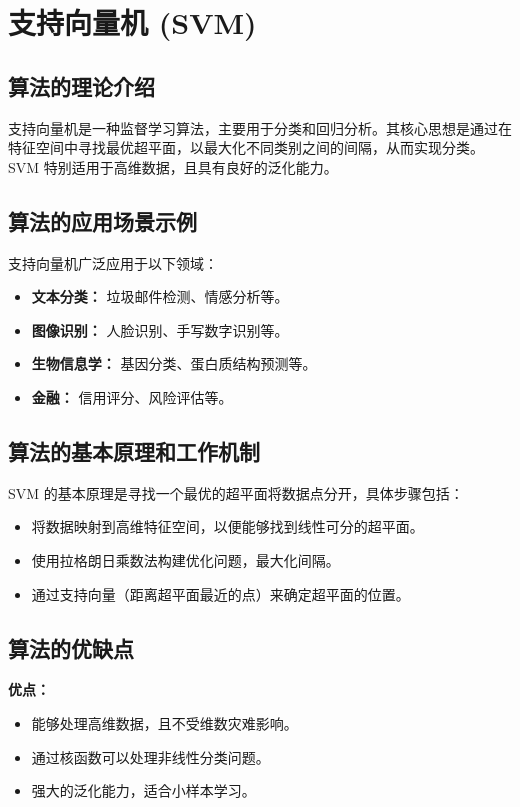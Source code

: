 \section{支持向量机 (SVM)}
\subsection*{算法的理论介绍}
支持向量机是一种监督学习算法，主要用于分类和回归分析。其核心思想是通过在特征空间中寻找最优超平面，以最大化不同类别之间的间隔，从而实现分类。SVM 特别适用于高维数据，且具有良好的泛化能力。

\subsection*{算法的应用场景示例}
支持向量机广泛应用于以下领域：
\begin{itemize}
    \item \textbf{文本分类：} 垃圾邮件检测、情感分析等。
    \item \textbf{图像识别：} 人脸识别、手写数字识别等。
    \item \textbf{生物信息学：} 基因分类、蛋白质结构预测等。
    \item \textbf{金融：} 信用评分、风险评估等。
\end{itemize}

\subsection*{算法的基本原理和工作机制}
SVM 的基本原理是寻找一个最优的超平面将数据点分开，具体步骤包括：
\begin{itemize}
    \item 将数据映射到高维特征空间，以便能够找到线性可分的超平面。
    \item 使用拉格朗日乘数法构建优化问题，最大化间隔。
    \item 通过支持向量（距离超平面最近的点）来确定超平面的位置。
\end{itemize}

\subsection*{算法的优缺点}
\textbf{优点：}
\begin{itemize}
    \item 能够处理高维数据，且不受维数灾难影响。
    \item 通过核函数可以处理非线性分类问题。
    \item 强大的泛化能力，适合小样本学习。
\end{itemize}

